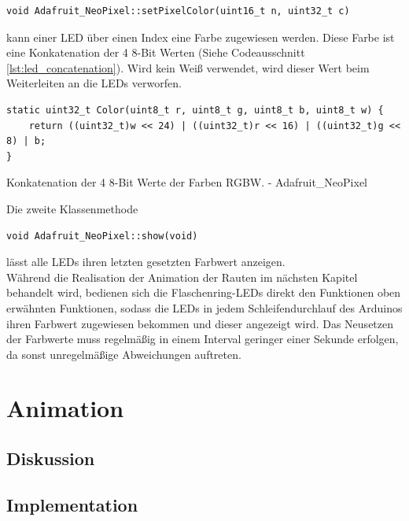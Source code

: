             \begin{verbatim}
void Adafruit_NeoPixel::setPixelColor(uint16_t n, uint32_t c)
            \end{verbatim}

            kann einer LED über einen Index eine Farbe zugewiesen werden.
            Diese Farbe ist eine Konkatenation der 4 8-Bit Werten (Siehe Codeausschnitt\,\ref{lst:led_concatenation}).
            Wird kein Weiß verwendet, wird dieser Wert beim Weiterleiten an die LEDs verworfen.

            \begin{listing}
                \begin{verbatim}
static uint32_t Color(uint8_t r, uint8_t g, uint8_t b, uint8_t w) {
    return ((uint32_t)w << 24) | ((uint32_t)r << 16) | ((uint32_t)g << 8) | b;
}
                \end{verbatim}
                \caption{Konkatenation der 4 8-Bit Werte der Farben RGBW. - Adafruit\_NeoPixel}
                \label{lst:led_concatenation}
            \end{listing}

            Die zweite Klassenmethode

            \begin{verbatim}
void Adafruit_NeoPixel::show(void)
            \end{verbatim}

            lässt alle LEDs ihren letzten gesetzten Farbwert anzeigen.\\

            Während die Realisation der Animation der Rauten im nächsten Kapitel behandelt wird, bedienen sich die Flaschenring-LEDs direkt den Funktionen oben erwähnten Funktionen, sodass die LEDs in jedem Schleifendurchlauf des Arduinos ihren Farbwert zugewiesen bekommen und dieser angezeigt wird.
            Das Neusetzen der Farbwerte muss regelmäßig in einem Interval geringer einer Sekunde erfolgen, da sonst unregelmäßige Abweichungen auftreten.


\section{Animation}

    \subsection{Diskussion}

    \subsection{Implementation}


